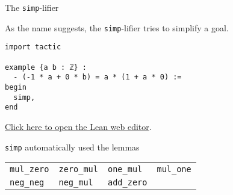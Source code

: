 \documentclass{beamer}
\begin{document}
\begin{frame}[fragile]{The {\color{violet}\texttt{simp}}-lifier}

As the name suggests, the {\color{violet}\verb`simp`}-lifier tries to simplify a goal.

\begin{verbatim}
import tactic

example {a b : ℤ} :
  - (-1 * a + 0 * b) = a * (1 + a * 0) :=
begin
  simp,
end
\end{verbatim}

\vspace{-17pt}
{\small{\href{https://leanprover-community.github.io/lean-web-editor/#code=import%20tactic%0A%0Aexample%20%7Ba%20b%20%3A%20%E2%84%A4%7D%20%3A%0A%20%20-%20%28-1%20*%20a%20%2B%200%20*%20b%29%20%3D%20a%20*%20%281%20%2B%20a%20*%200%29%20%3A%3D%0Abegin%0A%20%20simp%2C%0Aend}{Click here to open the Lean web editor}.}}

{\color{violet}\verb`simp`} automatically used the lemmas

\begin{tabular}{|l|l|l|l|}
\hline
 {\color{violet}\verb`mul_zero`} & {\color{violet}\verb`zero_mul`} & {\color{violet}\verb`one_mul`} & {\color{violet}\verb`mul_one`} \\
{\color{violet}\verb`neg_neg`} & {\color{violet}\verb`neg_mul`} & {\color{violet}\verb`add_zero`} &\\
\hline
\end{tabular}

\end{frame}
\end{document}

